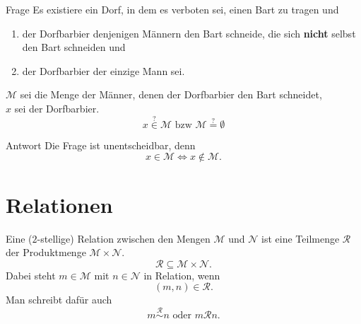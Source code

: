 \documentclass[]{beamer}
\begin{document}
\begin{frame}[<+->][squeeze]{}
  \begin{alertblock}{Frage}
    Es existiere ein Dorf, in dem es verboten sei, einen Bart zu tragen und
    \begin{enumerate}
      \item<0-> der Dorfbarbier denjenigen Männern den Bart schneide, die sich \textbf{nicht} selbst den Bart schneiden und
      \item<0-> der Dorfbarbier der einzige Mann sei.
    \end{enumerate}
    $\mathcal{M}$ sei die Menge der Männer, denen der Dorfbarbier den Bart schneidet, \\ $x$ sei der Dorfbarbier. \\
    \[x \overset{?}{\in} \mathcal{M} \text{ bzw } \mathcal{M} \overset{?}{=} \emptyset\]
  \end{alertblock}
  
  \begin{exampleblock}{Antwort}
    Die Frage ist unentscheidbar, denn
    \[x \in \mathcal{M} \Leftrightarrow x \notin \mathcal{M}.\]
  \end{exampleblock}
\end{frame}

\section{Relationen}
\begin{frame}[<+->][squeeze]{}
  \begin{definition}
    Eine ($2$-stellige) Relation zwischen den Mengen $\mathcal{M}$ und $\mathcal{N}$ ist eine
Teilmenge $\mathcal{R}$ der Produktmenge $\mathcal{M} \times \mathcal{N}$.
    \[\mathcal{R} \subseteq \mathcal{M} \times \mathcal{N}.\]
    Dabei steht $m \in \mathcal{M}$ mit $n \in \mathcal{N}$ in Relation, wenn
    \[(m, n) \in \mathcal{R}.\]
    Man schreibt dafür auch
    \[m \overset{\mathcal{R}}{\sim} n \text{ oder } m\mathcal{R}n.\]
  \end{definition}
\end{frame}
\end{document}
